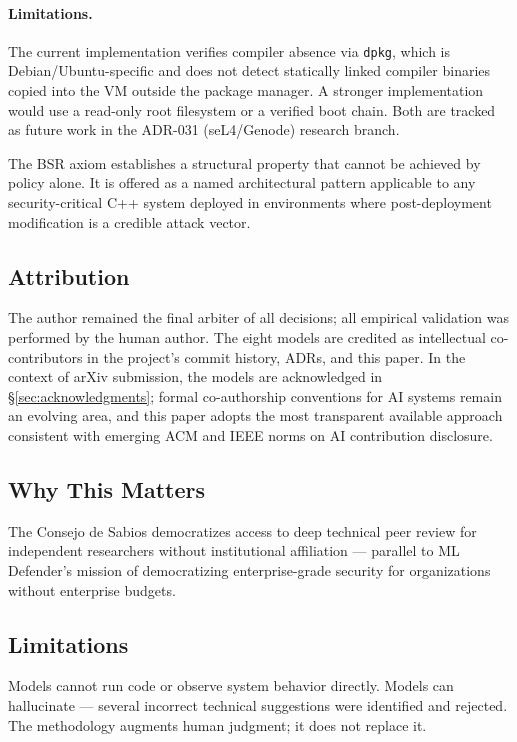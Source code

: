 \documentclass[11pt,a4paper]{article}
\begin{document}
    \paragraph{Limitations.}
    The current implementation verifies compiler absence via \texttt{dpkg}, which
    is Debian/Ubuntu-specific and does not detect statically linked compiler
    binaries copied into the VM outside the package manager. A stronger
    implementation would use a read-only root filesystem or a verified boot chain.
    Both are tracked as future work in the ADR-031 (seL4/Genode) research branch.

    The BSR axiom establishes a structural property that cannot be achieved by
    policy alone. It is offered as a named architectural pattern applicable to
    any security-critical C++ system deployed in environments where post-deployment
    modification is a credible attack vector.

    \subsection{Attribution}

    The author remained the final arbiter of all decisions; all empirical validation was
    performed by the human author. The eight models are credited as intellectual co-contributors
    in the project's commit history, ADRs, and this paper. In the context of arXiv submission,
    the models are acknowledged in \S\ref{sec:acknowledgments}; formal co-authorship conventions
    for AI systems remain an evolving area, and this paper adopts the most transparent available
    approach consistent with emerging ACM and IEEE norms on AI contribution disclosure.

    \subsection{Why This Matters}

    The Consejo de Sabios democratizes access to deep technical peer review for independent
    researchers without institutional affiliation --- parallel to ML Defender's mission of
    democratizing enterprise-grade security for organizations without enterprise budgets.

    \subsection{Limitations}

    Models cannot run code or observe system behavior directly. Models can hallucinate --- several
    incorrect technical suggestions were identified and rejected. The methodology augments human
    judgment; it does not replace it.
\end{document}
